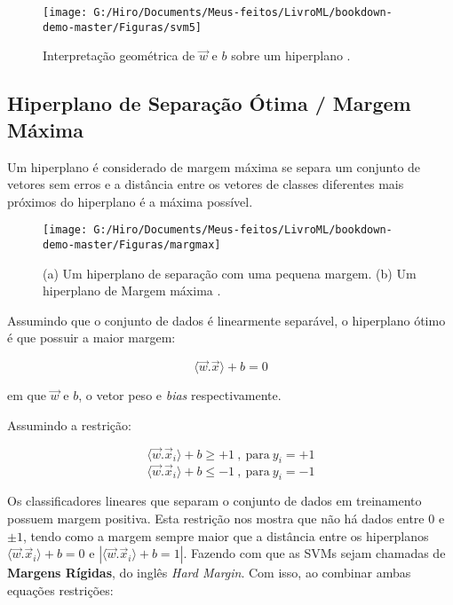 \documentclass[
  openany]{book}
\begin{document}
\begin{figure}

{\centering \texttt{[image: G:/Hiro/Documents/Meus-feitos/LivroML/bookdown-demo-master/Figuras/svm5]} 

}

\caption{Interpretação geométrica de \(\vec{w}\) e \(b\) sobre um hiperplano \citep{lima2002maquinas, gonccalves2015maquina}.}\label{fig:svm5}
\end{figure}



\hypertarget{margmax}{%
\subsection{Hiperplano de Separação Ótima / Margem Máxima}\label{margmax}}

Um hiperplano é considerado de margem máxima se separa um conjunto de vetores sem erros e a distância entre os vetores de classes diferentes mais próximos do hiperplano é a máxima possível.

\begin{figure}

{\centering \texttt{[image: G:/Hiro/Documents/Meus-feitos/LivroML/bookdown-demo-master/Figuras/margmax]} 

}

\caption{(a) Um hiperplano de separação com uma pequena margem. (b) Um hiperplano de Margem máxima \citep{da2009classificaccao}.}\label{fig:margmax}
\end{figure}



Assumindo que o conjunto de dados é linearmente separável, o hiperplano ótimo é que possuir a maior margem:

\begin{equation}
\langle\vec{w}.\vec{x}\rangle+b=0
\label{eq:maiormarg}
\end{equation}

em que \(\vec{w}\) e \(b\), o vetor peso e \emph{bias} respectivamente.

Assumindo a restrição:

\[\langle\vec{w}.\vec{x}_i\rangle+b\geq + 1 \ , \ \mbox{para} \ y_i=+1\]
\begin{equation}
\langle\vec{w}.\vec{x}_i\rangle+b\leq - 1 \ , \ \mbox{para} \ y_i=-1
\label{eq:restricaoclassif}
\end{equation}

Os classificadores lineares que separam o conjunto de dados em treinamento possuem margem positiva. Esta restrição nos mostra que não há dados entre 0 e \(\pm1\), tendo como a margem sempre maior que a distância entre os hiperplanos \(\langle\vec{w}.\vec{x}_i\rangle+b=0\) e \(|\langle\vec{w}.\vec{x}_i\rangle+b= 1|\). Fazendo com que as SVMs sejam chamadas de \textbf{Margens Rígidas}, do inglês \emph{Hard Margin}. Com isso, ao combinar ambas equações restrições:
\end{document}

